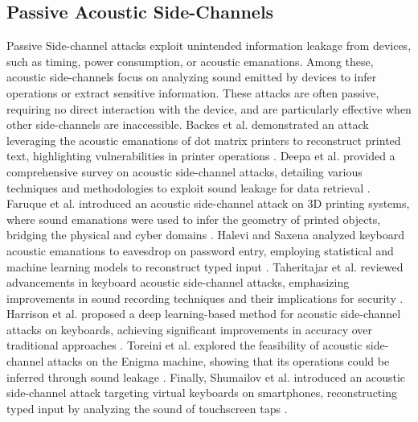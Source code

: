 \subsection{Passive Acoustic Side-Channels}
Passive Side-channel attacks exploit unintended information leakage from devices, such as timing, power consumption, or acoustic emanations. Among these, acoustic side-channels focus on analyzing sound emitted by devices to infer operations or extract sensitive information. These attacks are often passive, requiring no direct interaction with the device, and are particularly effective when other side-channels are inaccessible. Backes et al. demonstrated an attack leveraging the acoustic emanations of dot matrix printers to reconstruct printed text, highlighting vulnerabilities in printer operations \cite{Backes2010}. Deepa et al. provided a comprehensive survey on acoustic side-channel attacks, detailing various techniques and methodologies to exploit sound leakage for data retrieval \cite{Deepa2013}. Faruque et al. introduced an acoustic side-channel attack on 3D printing systems, where sound emanations were used to infer the geometry of printed objects, bridging the physical and cyber domains \cite{Faruque2016}. Halevi and Saxena analyzed keyboard acoustic emanations to eavesdrop on password entry, employing statistical and machine learning models to reconstruct typed input \cite{Halevi2015}. Taheritajar et al. reviewed advancements in keyboard acoustic side-channel attacks, emphasizing improvements in sound recording techniques and their implications for security \cite{Taheritajar2023}. Harrison et al. proposed a deep learning-based method for acoustic side-channel attacks on keyboards, achieving significant improvements in accuracy over traditional approaches \cite{Harrison2023}. Toreini et al. explored the feasibility of acoustic side-channel attacks on the Enigma machine, showing that its operations could be inferred through sound leakage \cite{Toreini2015}. Finally, Shumailov et al. introduced an acoustic side-channel attack targeting virtual keyboards on smartphones, reconstructing typed input by analyzing the sound of touchscreen taps \cite{Shumailov2019}.